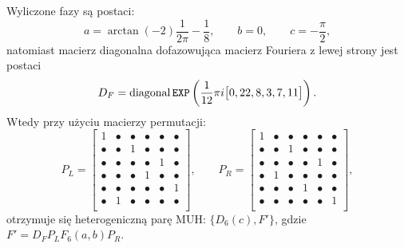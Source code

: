 \documentclass[a4paper,12pt,twoside]{article}
\begin{document}
Wyliczone fazy s\k{a} postaci:
\begin{equation}
    a= \arctan \left(-2\right)\frac{1}{2\pi}-\frac{1}{8},\qquad b=0,\qquad c=-\frac{\pi}{2},
\end{equation}
natomiast macierz diagonalna dofazowuj\k{a}ca macierz Fouriera z lewej strony jest postaci
\begin{equation}
    D_F = \textrm{diagonal}\,\verb"EXP" \left(\frac{1}{12}\pi i\big[0, 22, 8, 3, 7, 11\big]\right).
\end{equation}
Wtedy przy u\.{z}yciu macierzy permutacji:
\begin{equation}
P_L =
\left[
\begin{array}{cccccc}
      1 & \bullet & \bullet & \bullet & \bullet & \bullet\\
\bullet & \bullet &       1 & \bullet & \bullet & \bullet\\
\bullet & \bullet & \bullet & \bullet &       1 & \bullet\\
\bullet & \bullet & \bullet &       1 & \bullet & \bullet\\
\bullet & \bullet & \bullet & \bullet & \bullet &       1\\
\bullet &       1 & \bullet & \bullet & \bullet & \bullet\\
\end{array}
\right],\qquad
P_R =
\left[
\begin{array}{cccccc}
      1 & \bullet & \bullet & \bullet & \bullet & \bullet\\
\bullet & \bullet &       1 & \bullet & \bullet & \bullet\\
\bullet & \bullet & \bullet & \bullet &       1 & \bullet\\
\bullet &       1 & \bullet & \bullet & \bullet & \bullet\\
\bullet & \bullet & \bullet &       1 & \bullet & \bullet\\
\bullet & \bullet & \bullet & \bullet & \bullet &       1\\
\end{array}
\right],
\end{equation}
otrzymuje si\k{e} heterogeniczn\k{a} par\k{e} MUH: $\{D_6(c), F'\}$, gdzie
$F'= D_F P_L F_6(a, b) P_R$.
\end{document}
